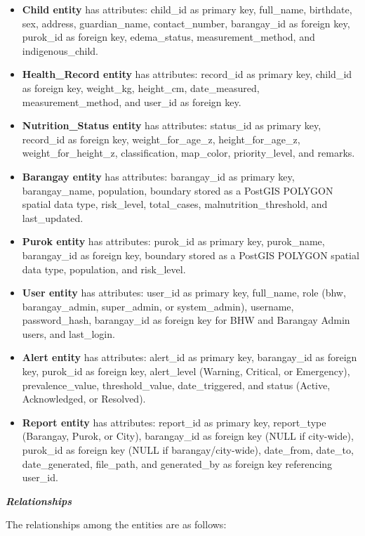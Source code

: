 \documentclass[12pt, a4paper]{report}
\begin{document}
\begin{itemize}
    \item \textbf{Child entity} has attributes: child\_id as primary key, full\_name, birthdate, sex, address, guardian\_name, contact\_number, barangay\_id as foreign key, purok\_id as foreign key, edema\_status, measurement\_method, and indigenous\_child.
    \item \textbf{Health\_Record entity} has attributes: record\_id as primary key, child\_id as foreign key, weight\_kg, height\_cm, date\_measured, measurement\_method, and user\_id as foreign key.
    \item \textbf{Nutrition\_Status entity} has attributes: status\_id as primary key, record\_id as foreign key, weight\_for\_age\_z, height\_for\_age\_z, weight\_for\_height\_z, classification, map\_color, priority\_level, and remarks.
    \item \textbf{Barangay entity} has attributes: barangay\_id as primary key, barangay\_name, population, boundary stored as a PostGIS POLYGON spatial data type, risk\_level, total\_cases, malnutrition\_threshold, and last\_updated.
    \item \textbf{Purok entity} has attributes: purok\_id as primary key, purok\_name, barangay\_id as foreign key, boundary stored as a PostGIS POLYGON spatial data type, population, and risk\_level.
    \item \textbf{User entity} has attributes: user\_id as primary key, full\_name, role (bhw, barangay\_admin, super\_admin, or system\_admin), username, password\_hash, barangay\_id as foreign key for BHW and Barangay Admin users, and last\_login.
    \item \textbf{Alert entity} has attributes: alert\_id as primary key, barangay\_id as foreign key, purok\_id as foreign key, alert\_level (Warning, Critical, or Emergency), prevalence\_value, threshold\_value, date\_triggered, and status (Active, Acknowledged, or Resolved).
    \item \textbf{Report entity} has attributes: report\_id as primary key, report\_type (Barangay, Purok, or City), barangay\_id as foreign key (NULL if city-wide), purok\_id as foreign key (NULL if barangay/city-wide), date\_from, date\_to, date\_generated, file\_path, and generated\_by as foreign key referencing user\_id.
\end{itemize}

\noindent \textbf{\textit{Relationships}}

The relationships among the entities are as follows:
\end{document}

